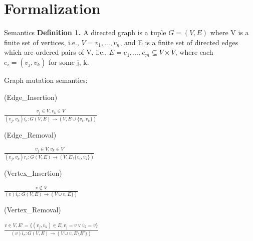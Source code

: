 \section{Formalization}
\begin{frame}{Semantics}
\textbf{Definition 1.} A directed graph is a tuple $G = (V, E)$ where V is a
finite set of vertices, i.e., $V={v_1,\ldots,v_n}$, and E is a finite set of
directed edges which are ordered pairs of V, i.e.,
$E={e_{1},\ldots,e_{m}}\subseteq V\times V$, where each $e_{i}=(v_{j},v_{k})$
for some j, k.
\end{frame}

\begin{frame}
Graph mutation semantics:\\
\begin{large}
(Edge\_Insertion)\\
\end{large}
\hspace{3cm}
\begin{Large}
$\frac{v_{j}\in V, v_{k}\in V}{(v_{j},v_{k})i_{e}:G(V,E)\rightarrow (V,E\cup
\{v_{i},v_{k}\})}$
\end{Large}

\vspace{5mm}

\begin{large}
(Edge\_Removal)\\
\end{large}
\hspace{3cm}
\begin{Large}
$\frac{v_{j}\in V, v_{k}\in V}{(v_{j},v_{k})r_e:G(V,E)\rightarrow
(V,E\setminus \{v_{i},v_{k}\})}$\\
\end{Large}
\vspace{5mm}
\begin{large}
(Vertex\_Insertion)\\
\end{large}
\hspace{3cm}
\begin{Large}
$\frac{v\notin V}{(v)i_v:G(V,E)\rightarrow
(V\cup v,E\})}$\\
\end{Large}
\vspace{5mm}
\begin{large}
(Vertex\_Removal)\\
\end{large}
\hspace{3cm}
\begin{Large}
$\frac{v\in V, E' = \{(v_j, v_k)\in E, v_j=v \lor v_k=v\}
}{(v)i_r:G(V,E)\rightarrow (V\cup v,E\setminus E' \})}$
\end{Large}

\end{frame}

